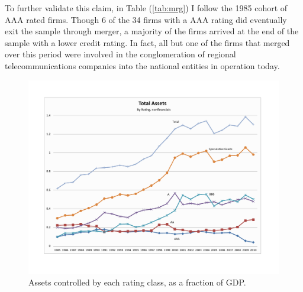 \documentclass[notitlepage]{article}
\begin{document}
To further validate this claim, in Table (\ref{tab:mrg}) I follow the 1985 cohort of AAA rated firms. Though 6 of the 34 firms with a AAA rating did eventually exit the sample through merger, a majority of the firms arrived at the end of the sample with a lower credit rating. In fact, all but one of the firms that merged over this period were involved in the conglomeration of regional telecommunications companies into the national entities in operation today.

\begin{figure}[ht]
\centering
	\includegraphics[width=\textwidth]{assets_nf.pdf}
	\caption{Assets controlled by each rating class, as a fraction of GDP.}
	\label{fig:assets}
\end{figure}
\end{document}
